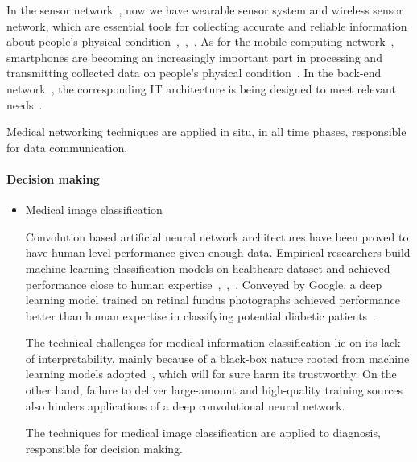 \documentclass[letterpaper, twocolumn, 10pt, conference]{IEEEtran}
\begin{document}
\begin{itemize}
In the sensor network~\cite{hc_paper_15}, now we have wearable sensor system and wireless sensor network, which are essential tools for collecting accurate and reliable information about people's physical condition~\cite{hc_paper_1},~\cite{hc_paper_17},~\cite{hc_paper_14}.  As for the mobile computing network~\cite{hc_paper_15}, smartphones are becoming an increasingly important part in processing and transmitting collected data on people's physical condition~\cite{hc_review_20}. In the back-end network~\cite{hc_paper_15}, the corresponding IT architecture is being designed to meet relevant needs~\cite{hc_survey_12}.


Medical networking techniques are applied in situ, in all time phases, responsible for data communication.

\end{itemize}


\paragraph{Decision making}

\begin{itemize} 

\item Medical image classification


Convolution based artificial neural network architectures have been proved to have human-level performance given enough data. Empirical researchers build machine learning classification models on healthcare dataset and achieved performance close to human expertise~\cite{hc_paper_6},~\cite{hc_paper_8},~\cite{hc_paper_10}. Conveyed by Google, a deep learning model trained on retinal fundus photographs achieved performance better than human expertise in classifying potential diabetic patients~\cite{hc_paper_10}.


The technical challenges for medical information classification lie on its lack of interpretability, mainly because of a black-box nature rooted from machine learning models adopted~\cite{hc_paper_24}, which will for sure harm its trustworthy. On the other hand, failure to deliver large-amount and high-quality training sources also hinders applications of a deep convolutional neural network.

The techniques for medical image classification are applied to diagnosis, responsible for decision making.

\end{itemize}
\end{document}
